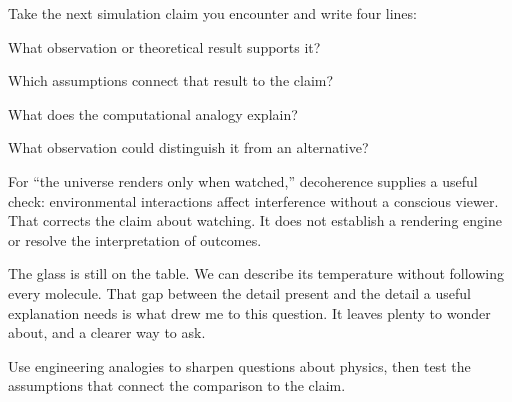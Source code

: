 \begin{quickpracticebox}
Take the next simulation claim you encounter and write four lines:
\begin{compactchecklist}
\item What observation or theoretical result supports it?
\item Which assumptions connect that result to the claim?
\item What does the computational analogy explain?
\item What observation could distinguish it from an alternative?
\end{compactchecklist}
For ``the universe renders only when watched,'' decoherence supplies a useful check: environmental interactions affect interference without a conscious viewer. That corrects the claim about watching. It does not establish a rendering engine or resolve the interpretation of outcomes.
\end{quickpracticebox}

The glass is still on the table. We can describe its temperature without following every molecule. That gap between the detail present and the detail a useful explanation needs is what drew me to this question. It leaves plenty to wonder about, and a clearer way to ask.

\begin{keytakeawaybox}
Use engineering analogies to sharpen questions about physics, then test the assumptions that connect the comparison to the claim.
\end{keytakeawaybox}
